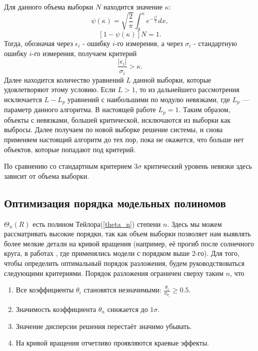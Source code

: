 \documentclass{matmex-diploma-custom}
\begin{document}
\par Для данного объема выборки $N$ находится значение $\kappa$:
\begin{equation}
\psi (\kappa) = \sqrt{\frac{2}{\pi}} \int_0^{\kappa} e^{- \frac{x^2}{2}} dx,
\end{equation}
\begin{equation}
\left[ 1 - \psi (\kappa) \right] N = 1.
\end{equation}
Тогда, обозначая через $\epsilon_i$ - ошибку $i$-го измерения, а через $\sigma_i$ - стандартную ошибку $i$-го измерения, получаем критерий
\begin{equation} \label{criteria}
\frac{\left| \epsilon_i \right|}{\sigma_i} > \kappa.
\end{equation}
Далее находится количество уравнений $L$ данной выборки, которые удовлетворяют этому условию. Если $L > 1$, то из дальнейшего рассмотрения исключается $L - L_p$ уравнений с наибольшими по модулю невязками, где $L_p$ — параметр данного алгоритма.  В настоящей работе $L_p = 1$. Таким образом, объекты с невязками, большей критической, исключаются из выборки как выбросы. Далее получаем по новой выборке решение системы, и снова применяем настоящий алгоритм до тех пор, пока не окажется, что больше нет объектов, которые попадают под критерий.
\par По сравнению со стандартным критерием $3\sigma$ критический уровень невязки здесь зависит от объема выборки.

\subsection{Оптимизация порядка модельных полиномов}
$\Theta_n(R)$ есть полином Тейлора(\ref{theta_n}) степени $n$. Здесь мы можем рассматривать высокие порядки, так как объем выборки позволяет нам выявлять более мелкие детали на кривой вращения (например, её прогиб после солнечного круга, в работах \cite{Rastorguev} \cite{Baikbob}, где применялись модели с порядком выше 2-го). Для того, чтобы определить оптимальный порядок разложения, будем руководствоваться следующими критериями.
Порядок разложения ограничен сверху таким $n$, что
\begin{enumerate}
        \item Все коэффициенты $\theta_i$ становятся незначимыми: $\frac{\theta_i}{\sigma_{\theta_i}}\geq 0.5$. \label{crit_1}
        \item Значимость коэффициента $\theta_n$ снижается до $1 \sigma$.  \label{crit_2}
        \item Значение дисперсии решения перестаёт значимо убывать. \label{crit_3}
        \item На кривой вращения отчетливо проявляются краевые эффекты. \label{crit_4}
\end{enumerate}
\end{document}
